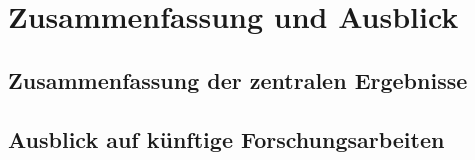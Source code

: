 \chapter{Zusammenfassung und Ausblick}
\label{cha:zusammenfassung}

\section{Zusammenfassung der zentralen Ergebnisse}

\section{Ausblick auf künftige Forschungsarbeiten}
